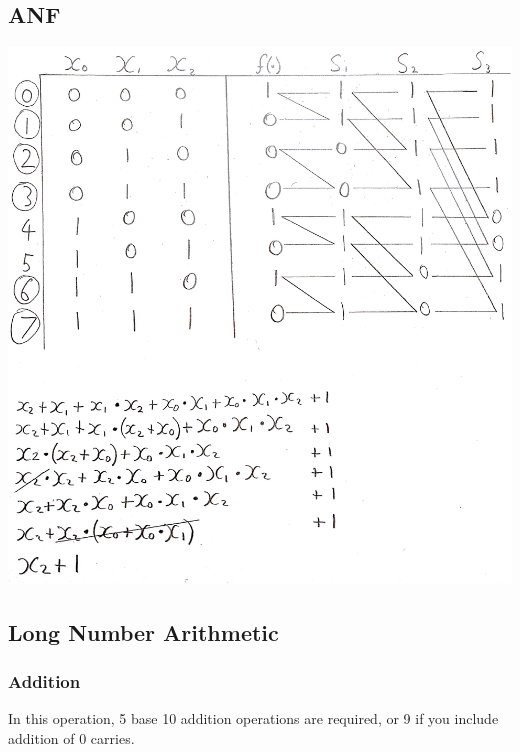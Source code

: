 \documentclass[11pt, a4paper]{article}
\begin{document}
\subsection{ANF}\label{subsec:anf}
\includegraphics[width=\textwidth]{anf}

\subsection{Long Number Arithmetic}\label{subsec:longnumberarithmetic}

\subsubsection{Addition}\label{subsubsec:addition}
\qquad

In this operation, 5 base 10 addition operations are required, or 9 if you include addition of 0 carries.
\end{document}
